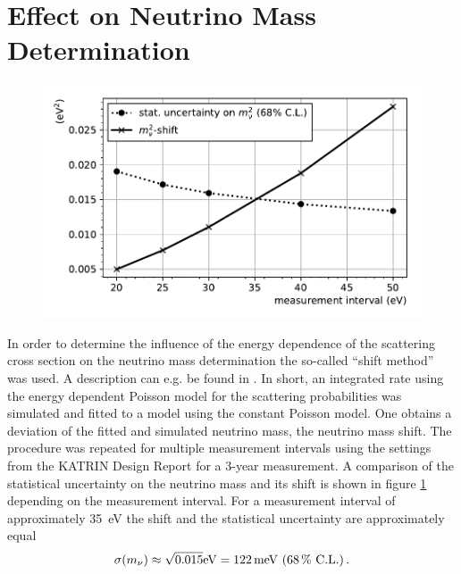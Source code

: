 \section{Effect on Neutrino Mass Determination}
\begin{figure}[t]
\includegraphics[width=\textwidth]{chapter/energyDependentCrossSec/fig/effectOnNuMass.pdf}
        \label{fig:energyDepCrossSecEffectOnNuMass}
\end{figure}
In order to determine the influence of the energy dependence of the scattering cross section on the neutrino mass determination the so-called ``shift method'' was used. A description can e.g. be found in \cite{SeitzM2019}.  In short, an integrated rate using the energy dependent Poisson model for the scattering probabilities was simulated and fitted to a model using the constant Poisson model. One obtains a deviation of the fitted and simulated neutrino mass, the neutrino mass shift. The procedure was repeated for multiple measurement intervals using the settings from the KATRIN Design Report \cite{Angrik:2005ep} for a 3-year measurement. A comparison of the statistical uncertainty on the neutrino mass and its shift is shown in figure \ref{fig:energyDepCrossSecEffectOnNuMass} depending on the measurement interval. For a measurement interval of approximately \SI{35}{eV} the shift and the statistical uncertainty are approximately equal
\begin{equation}
    \sigma(m_\nu) \approx 
    \sqrt{0.015}\SI{}{eV} = \SI{122}{meV} 
    \text{ (\SI{68}{\percent} C.L.)}
    \text{\,.}
\end{equation}

